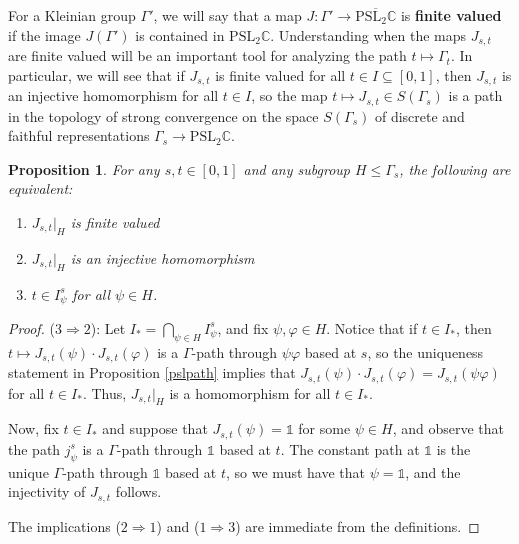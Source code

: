 \documentclass[11pt,leqno]{article}
\newtheorem{prop}[lemma]{Proposition}
\theoremstyle{introdef}
\numberwithin{lemma}{section}
\theoremstyle{definition}
\newcommand{\C}{\mathbb{C}}
\begin{document}
For a Kleinian group $\Gamma'$, we will say that a map $J:\Gamma'\rightarrow\overline{\mathrm{PSL}_2\C}$ is \textbf{finite valued} if the image $J(\Gamma')$ is contained in $\mathrm{PSL}_2\C$. Understanding when the maps $J_{s,t}$ are finite valued will be an important tool for analyzing the path $t\mapsto\Gamma_t$. In particular, we will see that if $J_{s,t}$ is finite valued for all $t\in I\subseteq[0,1]$, then $J_{s,t}$ is an injective homomorphism for all $t\in I$, so the map $t\mapsto J_{s,t}\in S(\Gamma_s)$ is a path in the topology of strong convergence on the space $S(\Gamma_s)$ of discrete and faithful representations $\Gamma_s\rightarrow\mathrm{PSL}_2\C$.

\begin{prop}
\label{Prop-InjConds}
    For any $s,t\in[0,1]$ and any subgroup $H\leq\Gamma_s$, the following are equivalent:
    \begin{enumerate}
        \item $J_{s,t}|_H$ is finite valued
        \item $J_{s,t}|_H$ is an injective homomorphism
        \item $t\in I_\psi^s$ for all $\psi\in H$.
    \end{enumerate}
\end{prop}

\begin{proof}
    
    ($3\Rightarrow 2$): Let $I_*=\bigcap_{\psi\in H}I_\psi^s$, and fix $\psi,\varphi\in H$. Notice that if $t\in I_*$, then $t\mapsto J_{s,t}(\psi)\cdot J_{s,t}(\varphi)$ is a $\Gamma$-path through $\psi\varphi$ based at $s$, so the uniqueness statement in Proposition \ref{pslpath} implies that $J_{s,t}(\psi)\cdot J_{s,t}(\varphi)=J_{s,t}(\psi\varphi)$ for all $t\in I_*$. Thus, $J_{s,t}|_H$ is a homomorphism for all $t\in I_*$.\par

    Now, fix $t\in I_*$ and suppose that $J_{s,t}(\psi)=\mathds{1}$ for some $\psi\in H$, and observe that the path $j_\psi^s$ is a $\Gamma$-path through $\mathds{1}$ based at $t$. The constant path at $\mathds{1}$ is the unique $\Gamma$-path through $\mathds{1}$ based at $t$, so we must have that $\psi=\mathds{1}$, and the injectivity of $J_{s,t}$ follows.\par

    The implications ($2\Rightarrow 1$) and ($1\Rightarrow 3$) are immediate from the definitions.
\end{proof}
\end{document}

